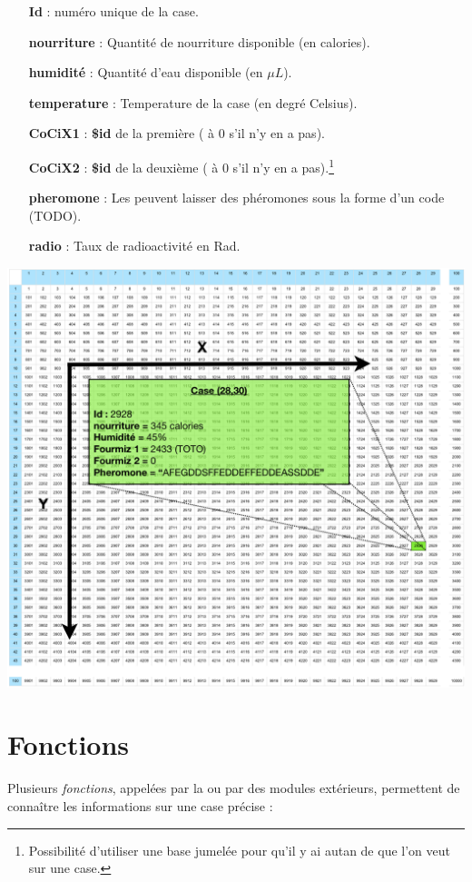 \documentclass[french]{report}
\newlength{\du}\fi
\begin{document}
\begin{itemize}
	\item[\textbf{Id}] : numéro unique de la case. 
	\item[\textbf{nourriture}] : Quantité de nourriture disponible (en calories).
	\item[\textbf{humidité}] : Quantité d'eau disponible (en $\mu L$).
	\item[\textbf{temperature}] : Temperature de la case (en degré Celsius).
	\item[\textbf{CoCiX1}] : \textbf{\$id} de la première \CoCiX ( à 0 s'il n'y en a pas).
	\item[\textbf{CoCiX2}] : \textbf{\$id} de la deuxième \CoCiX ( à 0 s'il n'y en a pas).\footnote{Possibilité d'utiliser une base jumelée pour qu'il y ai autan de \CoCiX que l'on veut sur une case.}
	\item[\textbf{pheromone}] : Les \CoCiX peuvent laisser des phéromones sous la forme d'un code (TODO).
	\item[\textbf{radio}] : Taux de radioactivité en Rad.\\
\end{itemize}

\centerline{\includegraphics[width=18cm]{Monde01.png}}\label{cartemode}

\section{Fonctions}\label{methodes_monde}
Plusieurs \textit{fonctions}, appelées par la \CoCiX ou par des modules extérieurs, permettent de connaître les informations sur une case précise : \\
\end{document}
